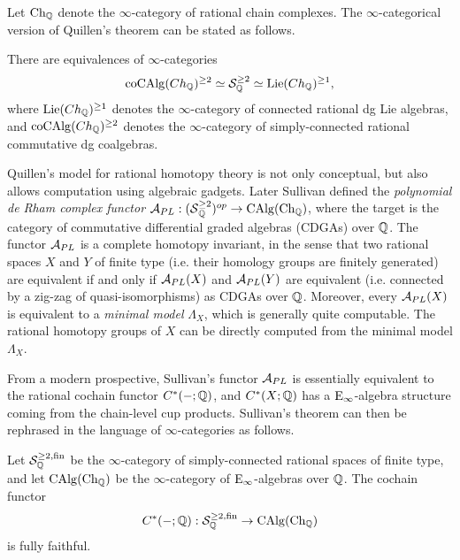 Let $\operatorname{Ch}_{{\mathbb{Q}}}$ denote the $\infty$-category of rational chain complexes. The $\infty$-categorical version of Quillen's theorem can be stated as follows.
\begin{theorem}
    \cite{Quillen_RHT}
    There are equivalences of $\infty$-categories
    $$
	\operatorname{coCAlg}(Ch_{{\mathbb{Q}}})^{\geq 2}\simeq {\mathcal{S}}^{\geq 2}_{{\mathbb{Q}}} \simeq \operatorname{Lie}(Ch_{{\mathbb{Q}}})^{\geq 1},
	$$
	where $\operatorname{Lie}(Ch_{{\mathbb{Q}}})^{\geq 1}$ denotes the $\infty$-category of connected rational dg Lie algebras, and $\operatorname{coCAlg}(Ch_{{\mathbb{Q}}})^{\geq 2}$ denotes the $\infty$-category of simply-connected rational commutative dg coalgebras.
\end{theorem}
Quillen's model for rational homotopy theory is not only conceptual, but also allows computation using algebraic gadgets. 
Later Sullivan \cite{Sullivan} defined the \emph{polynomial de Rham complex functor} ${\mathcal{A}}_{PL}:(\operatorname{\mathcal{S}}^{\geq 2}_{{\mathbb{Q}}})^{op} \to \operatorname{CAlg}(\operatorname{Ch}_{{\mathbb{Q}}})$, where the target is the category of commutative differential graded algebras (CDGAs) over ${\mathbb{Q}}$.
The functor ${\mathcal{A}}_{PL}$ is a complete homotopy invariant, in the sense that two rational spaces $X$ and $Y$ of finite type (i.e. their homology groups are finitely generated) are equivalent if and only if ${\mathcal{A}}_{PL}(X)$ and ${\mathcal{A}}_{PL}(Y)$ are equivalent (i.e. connected by a zig-zag of quasi-isomorphisms) as CDGAs over ${\mathbb{Q}}$.
Moreover, every ${\mathcal{A}}_{PL}(X)$ is equivalent to a \emph{minimal model} $\Lambda_X$, which is generally quite computable. The rational homotopy groups of $X$ can be directly computed from the minimal model $\Lambda_X$. 

From a modern prospective, Sullivan's functor ${\mathcal{A}}_{PL}$ is essentially equivalent to the rational cochain functor $C^*(-;{\mathbb{Q}})$, and $C^*(X;{\mathbb{Q}})$ has a $\operatorname{E}_\infty$-algebra structure coming from the chain-level cup products. Sullivan's theorem can then be rephrased in the language of $\infty$-categories as follows.
\begin{theorem}
    \cite{Sullivan}
    Let ${\mathcal{S}}^{\geq 2, \operatorname{fin}}_{{\mathbb{Q}}}$ be the $\infty$-category of simply-connected rational spaces of finite type, and let  $\operatorname{CAlg}(\operatorname{Ch}_{{\mathbb{Q}}})$ be the $\infty$-category of $\operatorname{E}_{\infty}$-algebras over ${\mathbb{Q}}$.
    The cochain functor 
$$
C^*(-;{\mathbb{Q}}): {\mathcal{S}}^{\geq 2, \operatorname{fin}}_{{\mathbb{Q}}}
\to 
\operatorname{CAlg}(\operatorname{Ch}_{{\mathbb{Q}}})
$$ 
is fully faithful.
\end{theorem}

